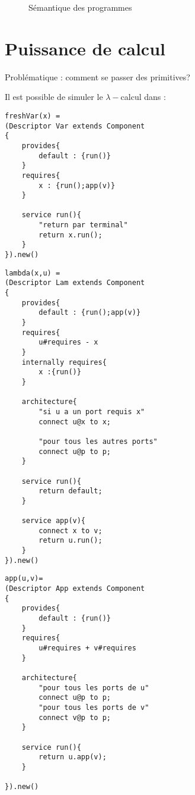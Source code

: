 \begin{figure}[ht!]
{{}}
\caption{Sémantique des programmes}


\label{fig:semexpr}
\end{figure}



\chapter{Puissance de calcul}
Problématique : comment se passer des primitives?

Il est possible de simuler le $\lambda -$calcul dans \compo : 
\begin{lstlisting}[caption = Variable]
freshVar(x) = 
(Descriptor Var extends Component
{
	provides{
		default : {run()}
	}
	requires{
		x : {run();app(v)}
	}
	
	service run(){
		"return par terminal"
		return x.run();
	}	
}).new()

\end{lstlisting}


\begin{lstlisting}[caption=$\lambda-$abstraction]
lambda(x,u) = 
(Descriptor Lam extends Component
{
	provides{
		default : {run();app(v)}
	}
	requires{
		u#requires - x
	}
	internally requires{
		x :{run()}
	}
	
	architecture{
		"si u a un port requis x"
		connect u@x to x;
		
		"pour tous les autres ports"
		connect u@p to p;
	}
	
	service run(){
		return default;
	}
	
	service app(v){
		connect x to v;
		return u.run();
	}
}).new()
\end{lstlisting}

\begin{lstlisting}[caption = Application]
app(u,v)=
(Descriptor App extends Component
{
	provides{
		default : {run()}
	}
	requires{
		u#requires + v#requires
	}
	
	architecture{		
		"pour tous les ports de u"
		connect u@p to p;
		"pour tous les ports de v"
		connect v@p to p;
	}
	
	service run(){
		return u.app(v);
	}
	
}).new()
\end{lstlisting}





